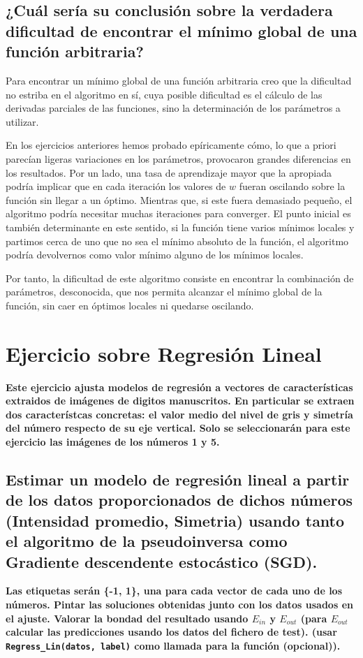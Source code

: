 \documentclass[a4paper, 20pt]{article}
\begin{document}
\subsection{¿Cuál sería su conclusión sobre la verdadera dificultad de encontrar el mínimo
global de una función arbitraria?}

Para encontrar un mínimo global de una función arbitraria creo que la dificultad no estriba en el algoritmo en sí, cuya posible dificultad es el cálculo de las derivadas parciales de las funciones, sino la determinación de los parámetros a utilizar.

En los ejercicios anteriores hemos probado epíricamente cómo, lo que a priori parecían ligeras variaciones en los parámetros, provocaron grandes diferencias en los resultados. Por un lado,  una tasa de aprendizaje mayor que la apropiada podría implicar que en cada iteración los valores de $w$ fueran oscilando sobre la función sin llegar a un óptimo. Mientras que, si este fuera demasiado pequeño, el algoritmo podría necesitar muchas iteraciones para converger. El punto inicial es también determinante en este sentido, si la función tiene varios mínimos locales y partimos cerca de uno que no sea el mínimo absoluto de la función, el algoritmo podría devolvernos como valor mínimo alguno de los mínimos locales.

Por tanto, la dificultad de este algoritmo consiste en encontrar la combinación de parámetros, desconocida, que nos permita alcanzar el mínimo global de la función, sin caer en óptimos locales ni quedarse oscilando.
\newpage
\section{Ejercicio sobre Regresión Lineal}
\textbf{Este ejercicio ajusta modelos de regresión a vectores de características extraidos de imágenes de digitos manuscritos. En particular se extraen dos característcas concretas: el valor medio del nivel de gris y simetría del número respecto de su eje vertical. Solo se seleccionarán para este ejercicio las imágenes de los números 1 y 5.}

\subsection{Estimar un modelo de regresión lineal a partir de los datos proporcionados de dichos números (Intensidad promedio, Simetria) usando tanto el algoritmo de la pseudoinversa como Gradiente descendente estocástico (SGD).}
\textbf{Las etiquetas serán \{-1, 1\}, una para cada vector de cada uno de los números. Pintar las soluciones obtenidas junto con los datos usados en el ajuste. Valorar la bondad del resultado usando $E_{in}$ y $E_{out}$ (para $E_{out}$ calcular las predicciones usando los datos del fichero de test). (usar \texttt{Regress\_Lin(datos, label)} como llamada para la función (opcional)).}

\newpage
\printbibliography
\end{document}
